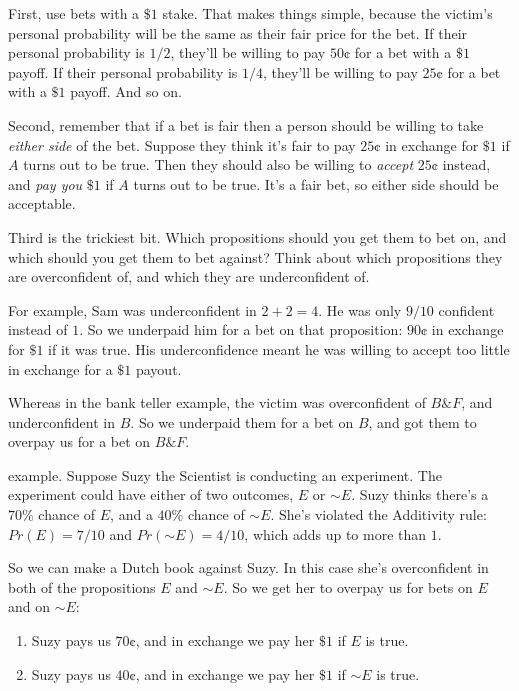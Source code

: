 \documentclass[justified]{tufte-book}
\providecommand{\tightlist}{%
  \setlength{\itemsep}{0pt}\setlength{\parskip}{0pt}}
\renewcommand{\neg}{\mathbin{\sim}}
\renewcommand{\wedge}{\mathbin{\&}}
\newcommand{\p}{Pr}
\theoremstyle{definition}
\theoremstyle{definition}
\theoremstyle{definition}
\theoremstyle{remark}
\begin{document}
First, use bets with a \(\$1\) stake. That makes things simple, because
the victim's personal probability will be the same as their fair price
for the bet. If their personal probability is \(1/2\), they'll be
willing to pay \(50\)¢ for a bet with a \(\$1\) payoff. If their
personal probability is \(1/4\), they'll be willing to pay \(25\)¢ for a
bet with a \(\$1\) payoff. And so on.

Second, remember that if a bet is fair then a person should be willing
to take \emph{either side} of the bet. Suppose they think it's fair to
pay \(25\)¢ in exchange for \(\$1\) if \(A\) turns out to be true. Then
they should also be willing to \emph{accept} \(25\)¢ instead, and
\emph{pay you} \(\$1\) if \(A\) turns out to be true. It's a fair bet,
so either side should be acceptable.

Third is the trickiest bit. Which propositions should you get them to
bet on, and which should you get them to bet against? Think about which
propositions they are overconfident of, and which they are
underconfident of.

For example, Sam was underconfident in \(2+2=4\). He was only \(9/10\)
confident instead of \(1\). So we underpaid him for a bet on that
proposition: \(90\)¢ in exchange for \(\$1\) if it was true. His
underconfidence meant he was willing to accept too little in exchange
for a \(\$1\) payout.

Whereas in the bank teller example, the victim was overconfident of
\(B \wedge F\), and underconfident in \(B\). So we underpaid them for a
bet on \(B\), and got them to overpay us for a bet on \(B \wedge F\).

 example. Suppose Suzy the Scientist is
conducting an experiment. The experiment could have either of two
outcomes, \(E\) or \(\neg E\). Suzy thinks there's a \(70\%\) chance of
\(E\), and a \(40\%\) chance of \(\neg E\). She's violated the
Additivity rule: \(\p(E) = 7/10\) and \(\p(\neg E) = 4/10\), which adds
up to more than \(1\).

So we can make a Dutch book against Suzy. In this case she's
overconfident in both of the propositions \(E\) and \(\neg E\). So we
get her to overpay us for bets on \(E\) and on \(\neg E\):

\begin{enumerate}
\def\labelenumi{\arabic{enumi}.}
\tightlist
\item
  Suzy pays us \(70\)¢, and in exchange we pay her \(\$1\) if \(E\) is
  true.
\item
  Suzy pays us \(40\)¢, and in exchange we pay her \(\$1\) if \(\neg E\)
  is true.
\end{enumerate}
\end{document}
